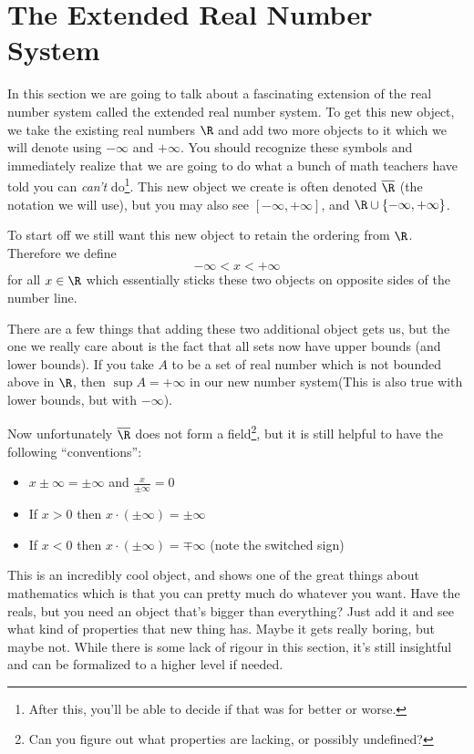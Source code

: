\documentclass[../../templates/section]{subfiles}
\begin{document}
\section{The Extended Real Number System}\label{sec:extended-real-number-system}

In this section we are going to talk about a fascinating extension of the real
number system called the extended real number system. To get this new object, we
take the existing real numbers $\R$ and add two more objects to it which we will
denote using $-\infty$ and $+\infty$. You should recognize these symbols and
immediately realize that we are going to do what a bunch of math teachers have
told you can \emph{can't} do\footnote{After this, you'll be able to decide if
that was for better or worse.}. This new object we create is often denoted
$\overline{\R}$ (the notation we will use), but you may also see $[-\infty, +\infty]$,
and $\R \cup \{-\infty, +\infty\}$.

To start off we still want this new object to retain the ordering from $\R$.
Therefore we define
\begin{equation*}
    -\infty < x < +\infty
\end{equation*}
for all $x\in\R$ which essentially sticks these two objects on opposite sides of
the number line.

There are a few things that adding these two additional object gets us, but the
one we really care about is the fact that all sets now have upper bounds (and
lower bounds). If you take $A$ to be a set of real number which is not bounded
above in $\R$, then $\sup{A} = +\infty$ in our new number system(This
is also true with lower bounds, but with $-\infty$).

Now unfortunately $\overline{\R}$ does not form a field\footnote{Can you figure out
what properties are lacking, or possibly undefined?}, but it is still helpful to have the following
``conventions'':
\begin{itemize}
    \item $x\pm\infty = \pm\infty$ and $\frac{x}{\pm\infty} = 0$
    \item If $x > 0$ then $x\cdot(\pm\infty) = \pm\infty$
    \item If $x < 0$ then $x\cdot(\pm\infty) = \mp\infty$ (note the switched sign)
\end{itemize}

This is an incredibly cool object, and shows one of the great things about
mathematics which is that you can pretty much do whatever you want. Have the
reals, but you need an object that's bigger than everything? Just add it and see
what kind of properties that new thing has. Maybe it gets really boring, but
maybe not. While there is some lack of rigour in this section, it's still
insightful and can be formalized to a higher level if needed.
\end{document}
